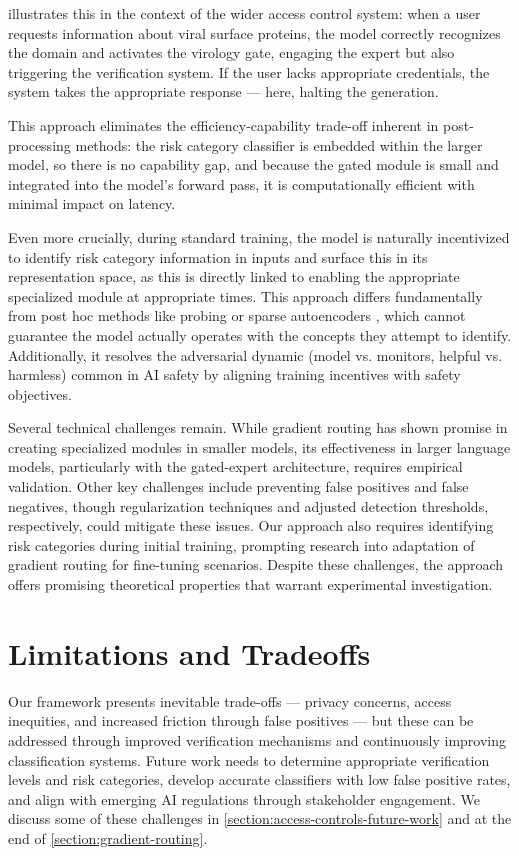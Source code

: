 \documentclass{article}
\theoremstyle{plain}
\theoremstyle{definition}
\theoremstyle{remark}
\begin{document}
 illustrates this in the context of the wider
access control system: when a user requests information about viral
surface proteins, the model correctly recognizes the domain and
activates the virology gate, engaging the expert but also triggering
the verification system. If the user lacks appropriate credentials,
the system takes the appropriate response --- here, halting the generation.

This approach eliminates the efficiency-capability
trade-off inherent in post-processing methods: the risk category
classifier is embedded within the larger model, so there is no
capability gap, and because the gated module is small and integrated
into the model's forward pass, it is computationally efficient with
minimal impact on latency.

Even more crucially, during standard training, the model is naturally
incentivized to identify risk category information in inputs and
surface this in its representation space, as this is directly linked
to enabling the appropriate specialized module at appropriate times.
This approach differs fundamentally from post hoc methods like
probing or sparse autoencoders
\cite{cunningham2023sparseautoencodershighlyinterpretable}, which
cannot guarantee the model actually operates with the concepts they
attempt to identify.
Additionally, it resolves the adversarial dynamic (model vs.
monitors, helpful vs. harmless) common in AI safety by aligning
training incentives with safety objectives.

Several technical challenges remain. While gradient routing has shown
promise in creating specialized modules in smaller models, its
effectiveness in larger language models, particularly with the
gated-expert architecture, requires empirical validation. Other key
challenges include preventing false positives and false negatives,
though regularization techniques and adjusted detection thresholds,
respectively, could mitigate these issues. Our approach also requires
identifying risk categories during initial training, prompting
research into adaptation of gradient routing for fine-tuning
scenarios. Despite these challenges, the approach offers promising
theoretical properties that warrant experimental investigation.

\section{Limitations and Tradeoffs}

Our framework presents inevitable trade-offs --- privacy concerns,
access inequities, and increased friction through false positives ---
but these can be addressed through improved verification mechanisms
and continuously improving classification systems. Future work needs
to determine appropriate verification levels and risk categories,
develop accurate classifiers with low false positive rates, and align
with emerging AI regulations through stakeholder engagement. We
discuss some of these challenges in
\cref{section:access-controls-future-work} and at the end of
\cref{section:gradient-routing}.
\end{document}
